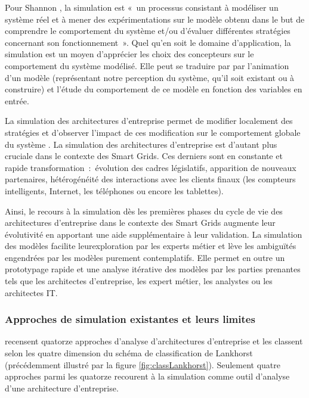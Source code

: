 Pour Shannon \cite{shannon1975systems}, la simulation est «~un processus
consistant à modéliser un système réel et à mener des expérimentations sur le
modèle obtenu dans le but de comprendre le comportement du système et/ou
d'évaluer différentes stratégies concernant son fonctionnement~».  Quel qu'en
soit le domaine d'application, la simulation est un moyen d'apprécier les choix
des concepteurs sur le comportement du système modélisé. Elle peut se traduire par
par l'animation d'un modèle (représentant notre perception du système,
qu'il soit existant ou à construire) et l'étude du comportement de ce modèle en
fonction des variables en entrée. 

La simulation des architectures d'entreprise permet de modifier localement des stratégies
et d'observer l'impact de ces modification sur le comportement globale du système \cite{buckl2008towards}. La simulation des architectures d'entreprise est d'autant plus cruciale dans le contexte des Smart Grids. Ces derniers sont en constante et rapide transformation~:~évolution des cadres législatifs, apparition de nouveaux partenaires, hétérogénéité des interactions avec les clients finaux (les compteurs intelligents, Internet, les téléphones ou encore les tablettes). 

Ainsi, le recours à la simulation dès les premières phases du cycle de vie des
architectures d'entreprise dans le contexte des Smart Grids augmente leur évolutivité en apportant une aide supplémentaire à leur validation. La simulation des modèles facilite leurexploration par les experts métier et lève les ambiguïtés engendrées par les
modèles purement contemplatifs. Elle permet en outre un prototypage rapide et
une analyse itérative des modèles par les parties prenantes tels que les
architectes d'entreprise, les expert métier, les analystes ou les architectes
IT. 

\subsubsection{Approches de simulation existantes et leurs limites}

\cite{manzur2015xarchimate} recensent quatorze approches d'analyse
d'architectures d'entreprise et les classent selon les quatre dimension du
schéma de classification de Lankhorst \cite{lankhorst2013enterprise} (précédemment illustré par la figure
\ref{fig:classLankhorst}). Seulement quatre approches parmi les quatorze
recourent à la simulation comme outil d'analyse d'une architecture
d'entreprise.

